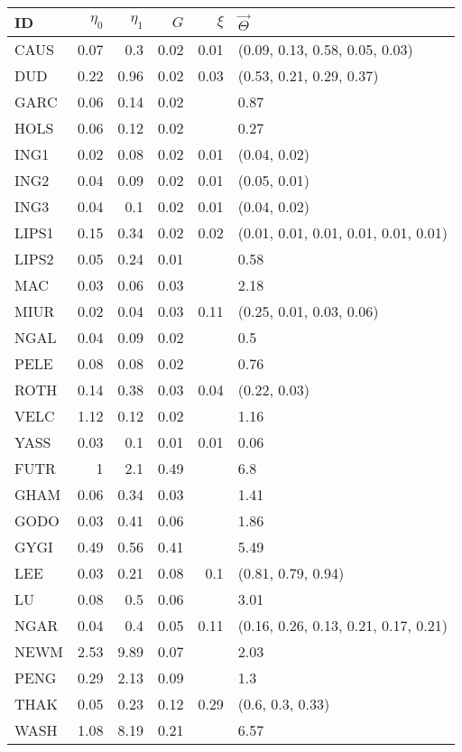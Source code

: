 \begin{tabular}{lrrrrl}
 ID & $\eta_0$ & $\eta_1$ & $G$ & $\xi$ & $\vec\Theta$ \\ 
  \hline
\textsc{CAUS} & 0.07 & 0.3 & 0.02 & 0.01 & (0.09, 0.13, 0.58, 0.05, 0.03) \\ 
  \textsc{DUD} & 0.22 & 0.96 & 0.02 & 0.03 & (0.53, 0.21, 0.29, 0.37) \\ 
  \textsc{GARC} & 0.06 & 0.14 & 0.02 &  & 0.87 \\ 
  \textsc{HOLS} & 0.06 & 0.12 & 0.02 &  & 0.27 \\ 
  \textsc{ING1} & 0.02 & 0.08 & 0.02 & 0.01 & (0.04, 0.02) \\ 
  \textsc{ING2} & 0.04 & 0.09 & 0.02 & 0.01 & (0.05, 0.01) \\ 
  \textsc{ING3} & 0.04 & 0.1 & 0.02 & 0.01 & (0.04, 0.02) \\ 
  \textsc{LIPS1} & 0.15 & 0.34 & 0.02 & 0.02 & (0.01, 0.01, 0.01, 0.01, 0.01, 0.01) \\ 
  \textsc{LIPS2} & 0.05 & 0.24 & 0.01 &  & 0.58 \\ 
  \textsc{MAC} & 0.03 & 0.06 & 0.03 &  & 2.18 \\ 
  \textsc{MIUR} & 0.02 & 0.04 & 0.03 & 0.11 & (0.25, 0.01, 0.03, 0.06) \\ 
  \textsc{NGAL} & 0.04 & 0.09 & 0.02 &  & 0.5 \\ 
  \textsc{PELE} & 0.08 & 0.08 & 0.02 &  & 0.76 \\ 
  \textsc{ROTH} & 0.14 & 0.38 & 0.03 & 0.04 & (0.22, 0.03) \\ 
  \textsc{VELC} & 1.12 & 0.12 & 0.02 &  & 1.16 \\ 
  \textsc{YASS} & 0.03 & 0.1 & 0.01 & 0.01 & 0.06 \\ 
   \hline
\textsc{FUTR} & 1 & 2.1 & 0.49 &  & 6.8 \\ 
  \textsc{GHAM} & 0.06 & 0.34 & 0.03 &  & 1.41 \\ 
  \textsc{GODO} & 0.03 & 0.41 & 0.06 &  & 1.86 \\ 
  \textsc{GYGI} & 0.49 & 0.56 & 0.41 &  & 5.49 \\ 
  \textsc{LEE} & 0.03 & 0.21 & 0.08 & 0.1 & (0.81, 0.79, 0.94) \\ 
  \textsc{LU} & 0.08 & 0.5 & 0.06 &  & 3.01 \\ 
  \textsc{NGAR} & 0.04 & 0.4 & 0.05 & 0.11 & (0.16, 0.26, 0.13, 0.21, 0.17, 0.21) \\ 
  \textsc{NEWM} & 2.53 & 9.89 & 0.07 &  & 2.03 \\ 
  \textsc{PENG} & 0.29 & 2.13 & 0.09 &  & 1.3 \\ 
  \textsc{THAK} & 0.05 & 0.23 & 0.12 & 0.29 & (0.6, 0.3, 0.33) \\ 
  \textsc{WASH} & 1.08 & 8.19 & 0.21 &  & 6.57 \\ 
   \hline
\end{tabular}
